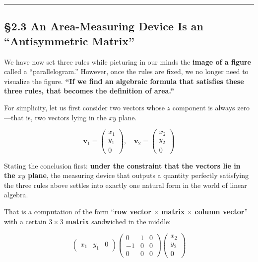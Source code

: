\begin{center}\rule{0.5\linewidth}{0.5pt}\end{center}

\hypertarget{an-area-measuring-device-is-an-antisymmetric-matrix}{%
\subsection{§2.3 An Area-Measuring Device Is an ``Antisymmetric
Matrix''}\label{an-area-measuring-device-is-an-antisymmetric-matrix}}

We have now set three rules while picturing in our minds the
\textbf{image of a figure} called a ``parallelogram.'' However, once the
rules are fixed, we no longer need to visualize the figure.
\textbf{“If we find an algebraic formula that satisfies these three rules, that becomes the definition of area.”}

For simplicity, let us first consider two vectors whose \(z\) component
is always zero---that is, two vectors lying in the \(xy\) plane.

\[
\mathbf{v}_1 = \begin{pmatrix} x_1 \\ y_1 \\ 0 \end{pmatrix}, \quad \mathbf{v}_2 = \begin{pmatrix} x_2 \\ y_2 \\ 0 \end{pmatrix}
\]

Stating the conclusion first:
\textbf{under the constraint that the vectors lie in the $xy$ plane},
the measuring device that outputs a quantity perfectly satisfying the
three rules above settles into exactly one natural form in the world of
linear algebra.

That is a computation of the form ``\textbf{row vector} \(\times\)
\textbf{matrix} \(\times\) \textbf{column vector}'' with a certain
\(3 \times 3\) \textbf{matrix} sandwiched in the middle:

\[
\begin{pmatrix} x_1 & y_1 & 0 \end{pmatrix}
\begin{pmatrix}
  0 & 1 & 0 \\
  -1 & 0 & 0 \\
  0 & 0 & 0
\end{pmatrix}
\begin{pmatrix} x_2 \\ y_2 \\ 0 \end{pmatrix}
\]

